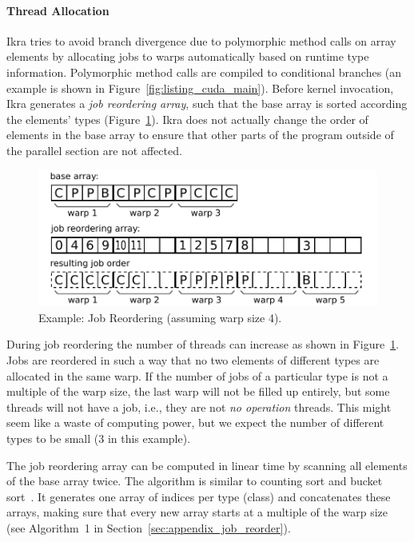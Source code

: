 \documentclass[preprint]{sigplanconf}
\begin{document}
\paragraph{Thread Allocation}
Ikra tries to avoid branch divergence due to polymorphic method calls on array elements by allocating jobs to warps automatically based on runtime type information. Polymorphic method calls are compiled to conditional branches (an example is shown in Figure~\ref{fig:listing_cuda_main}). Before kernel invocation, Ikra generates a \emph{job reordering array}, such that the base array is sorted according the elements' types (Figure~\ref{fig:ex_job_reorder}). Ikra does not actually change the order of elements in the base array to ensure that other parts of the program outside of the parallel section are not affected.

\begin{figure}[!htp]
    \centering
    \includegraphics[width=\columnwidth]{reorder_example.pdf}
    \caption{Example: Job Reordering (assuming warp size 4).}
    \label{fig:ex_job_reorder}
\end{figure}

During job reordering the number of threads can increase as shown in Figure~\ref{fig:ex_job_reorder}. Jobs are reordered in such a way that no two elements of different types are allocated in the same warp. If the number of jobs of a particular type is not a multiple of the warp size, the last warp will not be filled up entirely, but some threads will not have a job, i.e., they are not \emph{no operation} threads. This might seem like a waste of computing power, but we expect the number of different types to be small (3 in this example).

The job reordering array can be computed in linear time by scanning all elements of the base array twice. The algorithm is similar to counting sort and bucket sort~\cite{Corwin:2004:SLT:1040231.1040257}. It generates one array of indices per type (class) and concatenates these arrays, making sure that every new array starts at a multiple of the warp size (see Algorithm~1 in Section~\ref{sec:appendix_job_reorder}).
\end{document}
